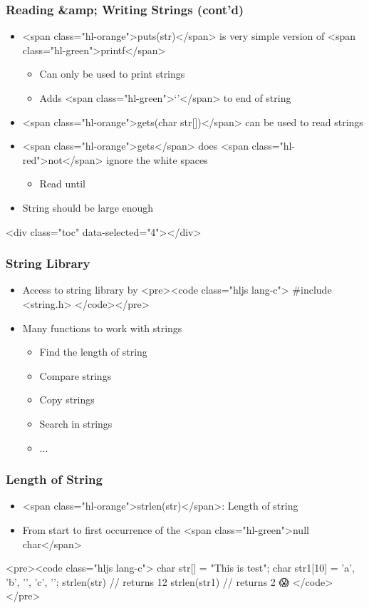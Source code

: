 \documentclass{../c-lecture}
\begin{document}
\begin{frame}
  \frametitle{Reading &amp; Writing Strings (cont’d)}
  \begin{itemize}
    \item
      <span class="hl-orange">puts(str)</span> is very simple version of
      <span class="hl-green">printf</span>

    \begin{itemize}
      \item Can only be used to print strings
      \item Adds <span class="hl-green">‘\n’</span> to end of string
    \end{itemize}
    \item
      <span class="hl-orange">gets(char str[])</span> can be used to read
      strings

    \item
      <span class="hl-orange">gets</span> does
      <span class="hl-red">not</span> ignore the white spaces

    \begin{itemize}
      \item Read until \n
    \end{itemize}
    \item String should be large enough
  \end{itemize}
\end{frame}
\begin{frame}
  <div class="toc" data-selected="4"></div>
\end{frame}
\begin{frame}
  \frametitle{String Library}
  \begin{itemize}
    \item Access to string library by
    <pre><code class="hljs lang-c">
#include <string.h>
    </code></pre>
    \item Many functions to work with strings
    \begin{itemize}
      \item Find the length of string
      \item Compare strings
      \item Copy strings
      \item Search in strings
      \item ...
    \end{itemize}
  \end{itemize}
\end{frame}
\begin{frame}
  \frametitle{Length of String}
  \begin{itemize}
    \item <span class="hl-orange">strlen(str)</span>: Length of string
    \item
      From start to first occurrence of the
      <span class="hl-green">null char</span>

  \end{itemize}
  <pre><code class="hljs lang-c">
char str[] = "This is test";
char str1[10] = {'a', 'b', '\0', 'c', '\0'};
strlen(str)  // returns 12
strlen(str1) // returns 2 😱
  </code></pre>
\end{frame}
\end{document}
